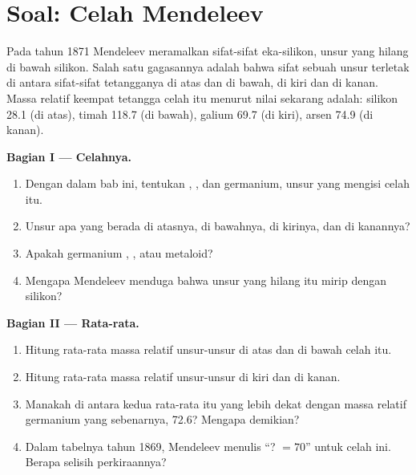 \section{Soal: Celah Mendeleev}

\begin{problem}
\label{pb:g9:periodic-table-first-look:1}
Pada tahun 1871 Mendeleev meramalkan sifat-sifat eka-silikon, unsur yang
hilang di bawah silikon. Salah satu gagasannya adalah bahwa sifat sebuah
unsur terletak di antara sifat-sifat tetangganya di atas dan di bawah,
di kiri dan di kanan. Massa  relatif keempat tetangga celah itu menurut
nilai sekarang adalah: silikon 28.1 (di atas), timah 118.7 (di bawah),
galium 69.7 (di kiri), arsen 74.9 (di kanan).

\medskip
\noindent\textbf{Bagian I --- Celahnya.}
\begin{enumerate}
  \item Dengan  dalam bab ini, tentukan , ,
        dan  germanium, unsur yang mengisi celah itu.
  \item Unsur apa yang berada di atasnya, di bawahnya, di kirinya, dan di
        kanannya?
  \item Apakah germanium , , atau metaloid?
  \item Mengapa Mendeleev menduga bahwa unsur yang hilang itu mirip
        dengan silikon?
\end{enumerate}

\medskip
\noindent\textbf{Bagian II --- Rata-rata.}
\begin{enumerate}[resume]
  \item Hitung rata-rata massa  relatif unsur-unsur di atas dan di bawah
        celah itu.
  \item Hitung rata-rata massa  relatif unsur-unsur di kiri dan di kanan.
  \item Manakah di antara kedua rata-rata itu yang lebih dekat dengan
        massa  relatif germanium yang sebenarnya, 72.6? Mengapa demikian?
  \item Dalam tabelnya tahun 1869, Mendeleev menulis ``? $= 70$'' untuk
        celah ini. Berapa selisih perkiraannya?
\end{enumerate}


\end{problem}
